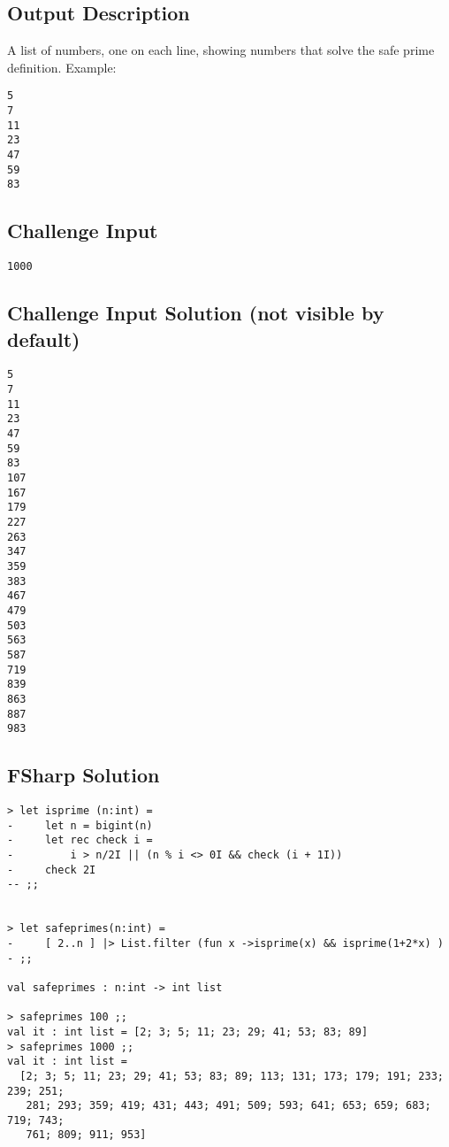\subsection{Output Description}\label{output-description-28}

A list of numbers, one on each line, showing numbers that solve the safe
prime definition. Example:

\begin{verbatim}
5
7
11
23
47
59
83
\end{verbatim}

\subsection{Challenge Input}\label{challenge-input-32}

\begin{verbatim}
1000
\end{verbatim}

\subsection{Challenge Input Solution (not visible by
default)}\label{challenge-input-solution-not-visible-by-default}

\begin{verbatim}
5
7
11
23
47
59
83
107
167
179
227
263
347
359
383
467
479
503
563
587
719
839
863
887
983
\end{verbatim}

\subsection{FSharp Solution}\label{fsharp-solution-3}

\begin{verbatim}
> let isprime (n:int) =                                                             
-     let n = bigint(n)
-     let rec check i =
-         i > n/2I || (n % i <> 0I && check (i + 1I))
-     check 2I
-- ;;


> let safeprimes(n:int) =
-     [ 2..n ] |> List.filter (fun x ->isprime(x) && isprime(1+2*x) )
- ;;

val safeprimes : n:int -> int list

> safeprimes 100 ;;
val it : int list = [2; 3; 5; 11; 23; 29; 41; 53; 83; 89]
> safeprimes 1000 ;;
val it : int list =
  [2; 3; 5; 11; 23; 29; 41; 53; 83; 89; 113; 131; 173; 179; 191; 233; 239; 251;
   281; 293; 359; 419; 431; 443; 491; 509; 593; 641; 653; 659; 683; 719; 743;
   761; 809; 911; 953]
\end{verbatim}


